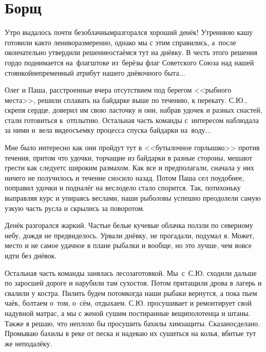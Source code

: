 \chapter{Борщ} 

Утро выдалось почти безоблачным\mdash разгорался хороший денёк! Утреннюю кашу готовили как\sdash то лениво\sdash размеренно, однако мы с этим справились, а~после окончательно утвердили решение\mdash остаёмся тут на днёвку. В честь этого решения гордо поднимается на~флагштоке из~берёзы флаг Советского Союза над нашей стоянкой\mdash непременный атрибут нашего днёвочного быта$\ldots$ 

Олег и Паша, расстроенные вчера отсутствием под берегом <<рыбного места>>, решили сплавать на байдарке выше по течению, к перекату. С.Ю., скрепя сердце, доверил им свою ласточку и они, набрав удочек и разных снастей, стали готовиться к~отплытию. Остальная часть команды с~интересом наблюдала за ними и~вела видеосъемку процесса спуска байдарки на~воду$\ldots$
 
Мне было интересно как они пройдут тут в <<бутылочное горлышко>> против течения, притом что удочки, торчащие из байдарки в разные стороны, мешают грести как следует\mdash с широким размахом. Как все и предполагали, сначала у них ничего не получилось и течение сносило назад. Потом Паша сел поудобнее, поправил удочки и подналёг на весло\mdash дело стало спорится. Так, потихоньку выправляя курс и упираясь веслами, наши рыболовы успешно преодолели самую узкую часть русла и скрылись за поворотом.

Денёк разгорался жаркий. Частые белые кучевые облачка ползли по северному небу, дождя не предвиделось. Урвали днёвку, не прогадали, подумал я. Может, место и не самое удачное в плане рыбалки и вообще, но это лучше, чем вовсе идти без днёвок.

Остальная часть команды занялась лесозаготовкой. Мы~с~С.Ю. сходили дальше по заросшей дороге и нарубили там сухостоя. Потом притащили дрова в лагерь и свалили у костра. Пилить будем потом\mdash когда наши рыбаки вернутся, а пока пьем чаёк, болтаем о~том, о~сём, отдыхаем. С.Ю. просушивает и ремонтирует свой надувной матрас, а мы с женой сушим постиранные вещи\mdash полотенца и штаны. Также я решаю, что неплохо бы просушить бахилы химзащиты. Сказано\mdash сделано. Промываю бахилы в реке от песка и надеваю их сушиться на колья, вбитые тут же неподалёку. 

